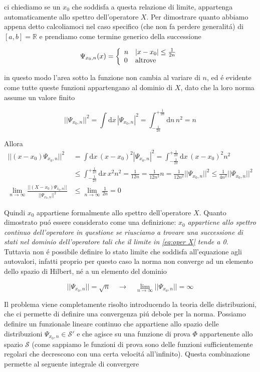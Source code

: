 ci chiediamo se un $x_{0}$ che soddisfa a questa relazione di limite, appartenga automaticamente allo spettro dell'operatore $X$. Per dimostrare quanto abbiamo appena detto calcoliamoci nel caso specifico (che non fa perdere generalit\'a) di $[a, b] = \mathbb{R}$ e prendiamo come termine generico della successione
	
$$\Psi_{x_{0},n}(x)={\left\{\begin{array}{l l}{n}&{|x-x_{0}|\leq{\frac{1}{2n}}}\\ {0}&{\text{altrove}}\end{array}\right.}$$

in questo modo l'area sotto la funzione non cambia al variare di $n$, ed \'e evidente come tutte queste funzioni appartengano al dominio di $X$, dato che la loro norma assume un valore finito

$$||\Psi_{x_{0},n}||^{2}=\int\mathrm{d}x\,|\Psi_{x_{0},n}|^{2}=\int_{-\frac{1}{2n}}^{+\frac{1}{2n}}\mathrm{d}n\,n^{2}=n$$

Allora
\begin{align*}
	||(x-x_{0})\Psi_{x_{0},n}||^{2}
	&=\int\mathrm{d}x\,(x-x_{0})^{2}|\Psi_{x_{0},n}|^{2}=\int_{-\frac{1}{2\pi}}^{+\frac{1}{2\pi}}\mathrm{d}x\,(x-x_{0})^{2}n^{2}
	\\
	&\leq\int_{-\frac{1}{2\pi}}^{+\frac{1}{2\pi}}\mathrm{d}x\,x^{2}n^{2}=\frac{1}{12n}=\frac{1}{12n^{2}}n=\frac{1}{12n^{2}}||\Psi_{x_{0},n}||^{2}\leq\frac{1}{4n^{2}}||\Psi_{x_{0},n}||^{2}
	\\ 
	\lim_{n\to\infty}\frac{||(X-x_{0})\Psi_{x_{0},n}||}{||\Psi_{x_{0},n}||^{2}}
	&\leq\lim_{n\to\infty}\frac{1}{2n}=0
\end{align*}

Quindi $x_0$ appartiene formalmente allo spettro dell'operatore $X$. Quanto dimostrato pu\'o essere considerato come una definizione: $x_0$ \textit{appartiene allo spettro continuo dell'operatore in questione se riusciamo a trovare una successione di stati nel dominio dell'operatore tali che il limite in \ref{eq:oper X} tende a 0.} Tuttavia non \'e possibile definire lo stato limite che soddisfa all'equazione agli autovalori, infatti proprio per questo caso la norma non converge ad un elemento dello spazio di Hilbert, n\'e a un elemento del dominio
	
$$||\Psi_{x_{0},n}||={\sqrt{n}}\quad\longrightarrow\quad\operatorname*{lim}_{n\longrightarrow\infty}||\Psi_{x_{0},n}||=\infty$$

Il problema viene completamente risolto introducendo la teoria delle distribuzioni, che ci permette di definire una convergenza pi\'u debole per la norma. Possiamo definire un funzionale lineare continuo che appartiene allo spazio delle distribuzioni $\Psi_{x_0,n} \in \mathcal{S}'$ e che agisce su una funzione di prova $\Phi$ appartenente allo spazio $\mathcal{S}$ (come sappiamo le funzioni di prova sono delle funzioni sufficientemente regolari che decrescono con una certa velocit\'a all'infinito). Questa combinazione permette al seguente integrale di convergere

